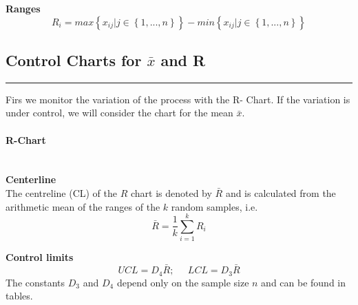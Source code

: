 \textbf{Ranges}
\begin{equation}
  R_i = max\left \{x_{ij} | j \in \left \{1,...,n\right \} \right \} - min\left \{x_{ij} | j \in \left \{1,...,n\right \} \right \}
\end{equation}

\subsection{Control Charts for $\bar{x}$ and R}
\noindent\rule[\linienAbstand]{\linewidth}{\linienDicke}
Firs we monitor the variation of the process with the R- Chart. If the variation is under control, we will consider the chart for
the mean $\bar{x}$.\\
\paragraph{R-Chart}\mbox{}\\
\textbf{Centerline}\\
The centreline (CL) of the $R$ chart is denoted by $\bar{R}$ and is calculated from the arithmetic mean of the ranges of the $k$ random samples, i.e.
\begin{equation}
  \bar{R} = \frac{1}{k} \sum^k_{i=1} R_i
\end{equation}

\textbf{Control limits}\\
\begin{equation}
    UCL = D_4 \bar{R}; \;\;\;\;\; LCL = D_3 \bar{R}
\end{equation}
The constants $D_3$ and $D_4$ depend only on the sample size $n$ and can be found in tables.

